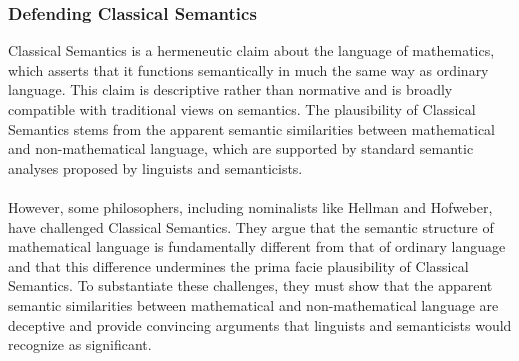 \documentclass[10pt,a4paper]{article}
\begin{document}
                    \subsubsection{Defending Classical Semantics}
                        Classical Semantics is a hermeneutic claim about the language of mathematics, which asserts that it functions semantically in much the same way as ordinary language. This claim is descriptive rather than normative and is broadly compatible with traditional views on semantics. The plausibility of Classical Semantics stems from the apparent semantic similarities between mathematical and non-mathematical language, which are supported by standard semantic analyses proposed by linguists and semanticists.
                        \\
                        \\
                        However, some philosophers, including nominalists like Hellman and Hofweber, have challenged Classical Semantics. They argue that the semantic structure of mathematical language is fundamentally different from that of ordinary language and that this difference undermines the prima facie plausibility of Classical Semantics. To substantiate these challenges, they must show that the apparent semantic similarities between mathematical and non-mathematical language are deceptive and provide convincing arguments that linguists and semanticists would recognize as significant.
\end{document}
